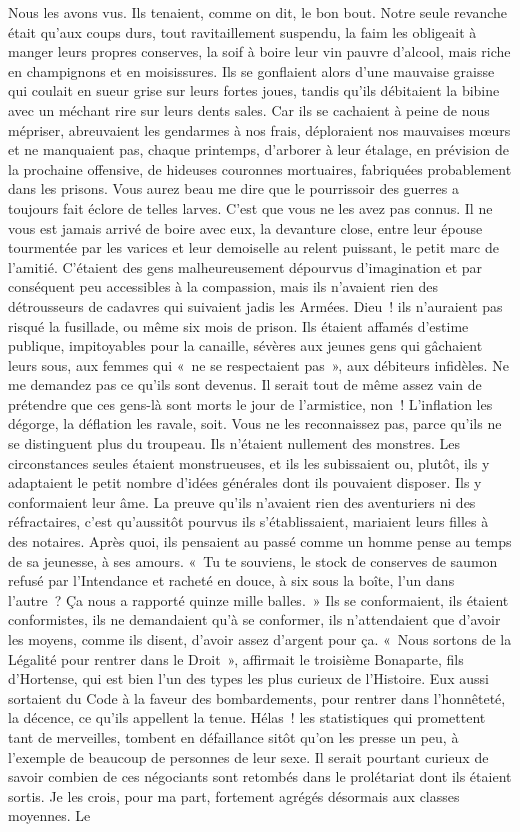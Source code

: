 \documentclass[french,twoside]{book} %
\begin{document}
\bigbreak
\noindent Nous les avons vus. Ils tenaient, comme on dit, le bon bout. Notre seule revanche était qu’aux coups durs, tout ravitaillement suspendu, la faim les obligeait à manger leurs propres conserves, la soif à boire leur vin pauvre d’alcool, mais riche en champignons et en moisissures. Ils se gonflaient alors d’une mauvaise graisse qui coulait en sueur grise sur leurs fortes joues, tandis qu’ils débitaient la bibine avec un méchant rire sur leurs dents sales. Car ils se cachaient à peine de nous mépriser, abreuvaient les gendarmes à nos frais, déploraient nos mauvaises mœurs et ne manquaient pas, chaque printemps, d’arborer à leur étalage, en prévision de la prochaine offensive, de hideuses couronnes mortuaires, fabriquées probablement dans les prisons. Vous aurez beau me dire que le pourrissoir des guerres a toujours fait éclore de telles larves. C’est que vous ne les avez pas connus. Il ne vous est jamais arrivé de boire avec eux, la devanture close, entre leur épouse tourmentée par les varices et leur demoiselle au relent puissant, le petit marc de l’amitié. C’étaient des gens malheureusement dépourvus d’imagination et par conséquent peu accessibles à la compassion, mais ils n’avaient rien des détrousseurs de cadavres qui suivaient jadis les Armées. Dieu ! ils n’auraient pas risqué la fusillade, ou même six mois de prison. Ils étaient affamés d’estime publique, impitoyables pour la canaille, sévères aux jeunes gens qui gâchaient leurs sous, aux femmes qui « ne se respectaient pas », aux débiteurs infidèles. Ne me demandez pas ce qu’ils sont devenus. Il serait tout de même assez vain de prétendre que ces gens-là sont morts le jour de l’armistice, non ! L’inflation les dégorge, la déflation les ravale, soit. Vous ne les reconnaissez pas, parce qu’ils ne se distinguent plus du troupeau. Ils n’étaient nullement des monstres. Les circonstances seules étaient monstrueuses, et ils les subissaient ou, plutôt, ils y adaptaient le petit nombre d’idées générales dont ils pouvaient disposer. Ils y conformaient leur âme. La preuve qu’ils n’avaient rien des aventuriers ni des réfractaires, c’est qu’aussitôt pourvus ils s’établissaient, mariaient leurs filles à des notaires. Après quoi, ils pensaient au passé comme un homme pense au temps de sa jeunesse, à ses amours. « Tu te souviens, le stock de conserves de saumon refusé par l’Intendance et racheté en douce, à six sous la boîte, l’un dans l’autre ? Ça nous a rapporté quinze mille balles. » Ils se conformaient, ils étaient conformistes, ils ne demandaient qu’à se conformer, ils n’attendaient que d’avoir les moyens, comme ils disent, d’avoir assez d’argent pour ça. « Nous sortons de la Légalité pour rentrer dans le Droit », affirmait le troisième Bonaparte, fils d’Hortense, qui est bien l’un des types les plus curieux de l’Histoire. Eux aussi sortaient du Code à la faveur des bombardements, pour rentrer dans l’honnêteté, la décence, ce qu’ils appellent la tenue. Hélas ! les statistiques qui promettent tant de merveilles, tombent en défaillance sitôt qu’on les presse un peu, à l’exemple de beaucoup de personnes de leur sexe. Il serait pourtant curieux de savoir combien de ces négociants sont retombés dans le prolétariat dont ils étaient sortis. Je les crois, pour ma part, fortement agrégés désormais aux classes moyennes. Le 
\end{document}
